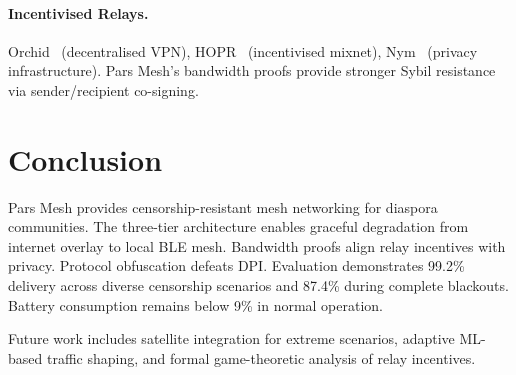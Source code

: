\documentclass[11pt,a4paper]{article}
\begin{document}
\paragraph{Incentivised Relays.}
Orchid~\cite{orchid2019} (decentralised VPN),
HOPR~\cite{hopr2020} (incentivised mixnet),
Nym~\cite{nym2020} (privacy infrastructure).  Pars Mesh's bandwidth
proofs provide stronger Sybil resistance via sender/recipient co-signing.

\section{Conclusion}
\label{sec:conclusion}

Pars Mesh provides censorship-resistant mesh networking for diaspora
communities.  The three-tier architecture enables graceful degradation from
internet overlay to local BLE mesh.  Bandwidth proofs align relay incentives
with privacy.  Protocol obfuscation defeats DPI.  Evaluation demonstrates
99.2\% delivery across diverse censorship scenarios and 87.4\% during
complete blackouts.  Battery consumption remains below 9\% in normal
operation.

Future work includes satellite integration for extreme scenarios, adaptive
ML-based traffic shaping, and formal game-theoretic analysis of relay
incentives.
\end{document}
